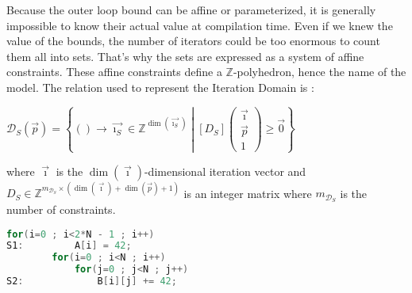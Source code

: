 \documentclass[paper=a4, fontsize=11.5pt]{scrartcl}
\numberwithin{equation}{section}        %
\numberwithin{figure}{section}          %
\numberwithin{table}{section}               %
\begin{document}
        Because the outer loop bound can be affine or parameterized, it is generally impossible to
        know their actual value at compilation time. Even if we knew the value of the
        bounds, the number of iterators could be too enormous to count them all into sets.
        That's why the sets are expressed as a system of affine constraints.
        These affine constraints define a $\mathbb{Z}$-polyhedron, hence the name of the model.
        The relation used to represent the Iteration Domain is :
        \begin{center}
            $ \mathcal{D}_S(\vec{p}) = \left\{() \to \vec{\imath_S} \in \mathbb{Z}^{\dim(\vec{\imath_S})}
            \middle|
            \left[D_S\right]\begin{pmatrix}\vec{\imath} \\ \vec{p} \\ 1\end{pmatrix}
            \geq \vec{0}
            \right\}$
        \end{center}
        where $\vec{\imath}$ is the $\dim(\vec{\imath})$-dimensional iteration vector and
        $D_S \in \mathbb{Z}^{m_{\mathcal{D}_S} \times (\dim(\vec{\imath})+\dim(\vec{p})+1)}$
        is an integer matrix where $m_{\mathcal{D}_S}$ is the number of constraints.
        \\

\begin{lstlisting}[frame=single, language=C, caption={Simple code for polyhedral model example}, label={lst:polyhedral_example}]
        for(i=0 ; i<2*N - 1 ; i++)
S1:         A[i] = 42;
        for(i=0 ; i<N ; i++)
            for(j=0 ; j<N ; j++)
S2:             B[i][j] += 42;
\end{lstlisting}
        
\end{document}
